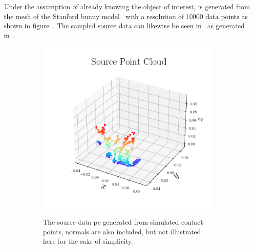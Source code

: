 Under the assumption of already knowing the object of interest,  is generated from the mesh of the Stanford bunny model~\cite{stanford-bunny} with a resolution of \num{10 000} data points as shown in figure~. The sampled source data  can likewise be seen in~ as generated in~. \medskip
%
\begin{figure}[!h]
	\centering
	\begin{subfigure}[b]{0.48\textwidth}
		\centering
		\includegraphics[width=\textwidth]{chapters/1-tactile-perception/fig/matplotlib/pc_source.png}
		\caption{The source data  \gls{pc} generated from simulated contact points, normals are also included, but not illustrated here for the sake of simplicity.}
		\label{fig:pe-pc-source}
	\end{subfigure}
	\hfill
	\begin{subfigure}[b]{0.48\textwidth}
		\centering

\end{subfigure}
\end{figure}
